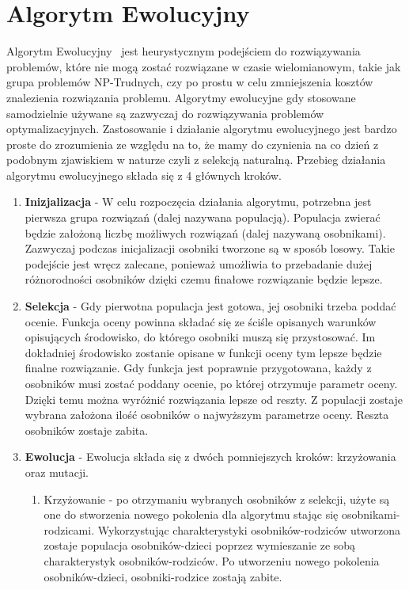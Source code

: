 \section{Algorytm Ewolucyjny}
Algorytm Ewolucyjny~\cite{evolution_algorithm} jest heurystycznym podejściem do rozwiązywania problemów, które nie mogą zostać rozwiązane w czasie wielomianowym, takie jak grupa problemów NP-Trudnych, czy po prostu w celu zmniejszenia kosztów znalezienia rozwiązania problemu. Algorytmy ewolucyjne gdy stosowane samodzielnie używane są zazwyczaj do rozwiązywania problemów optymalizacyjnych. Zastosowanie i działanie algorytmu ewolucyjnego jest bardzo proste do zrozumienia ze względu na to, że mamy do czynienia na co dzień z podobnym zjawiskiem w naturze czyli z selekcją naturalną. Przebieg działania algorytmu ewolucyjnego składa się z 4 głównych kroków.
	\begin{enumerate}
	\item \textbf{Inizjalizacja} - W celu rozpoczęcia działania algorytmu, potrzebna jest pierwsza grupa rozwiązań (dalej nazywana populacją). Populacja zwierać będzie założoną liczbę możliwych rozwiązań (dalej nazywaną osobnikami). Zazwyczaj podczas inicjalizacji osobniki tworzone są w sposób losowy. Takie podejście jest wręcz zalecane, ponieważ umożliwia to przebadanie dużej różnorodności osobników dzięki czemu finałowe rozwiązanie będzie lepsze.
	\item \textbf{Selekcja} - Gdy pierwotna populacja jest gotowa, jej osobniki trzeba poddać ocenie. Funkcja oceny powinna składać się ze ściśle opisanych warunków opisujących środowisko, do którego osobniki muszą się przystosować. Im dokładniej środowisko zostanie opisane w funkcji oceny tym lepsze będzie finalne rozwiązanie. Gdy funkcja jest poprawnie przygotowana, każdy z osobników musi zostać poddany ocenie, po której otrzymuje parametr oceny. Dzięki temu można wyróżnić rozwiązania lepsze od reszty. Z populacji zostaje wybrana założona ilość osobników o najwyższym parametrze oceny. Reszta osobników zostaje zabita.
	\item \textbf{Ewolucja} - Ewolucja składa się z dwóch pomniejszych kroków: krzyżowania oraz mutacji. 
	\begin{enumerate}
		\item Krzyżowanie - po otrzymaniu wybranych osobników z selekcji, użyte są one do stworzenia nowego pokolenia dla algorytmu stając się osobnikami-rodzicami. Wykorzystując charakterystyki osobników-rodziców utworzona zostaje populacja osobników-dzieci poprzez wymieszanie ze sobą charakterystyk osobników-rodziców. Po utworzeniu nowego pokolenia osobników-dzieci, osobniki-rodzice zostają zabite.

\end{enumerate}
\end{enumerate}
